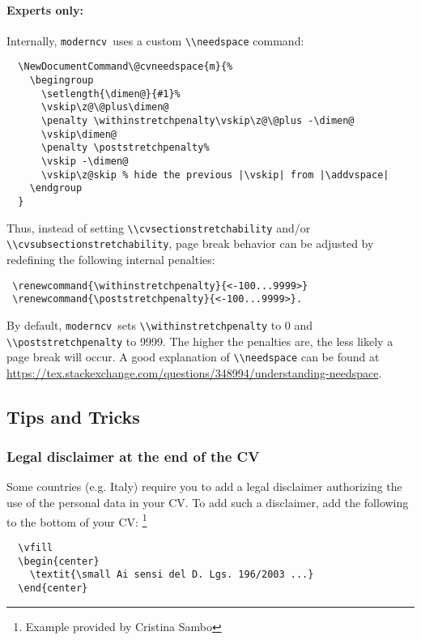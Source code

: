 \documentclass[a4paper, 11pt]{article}
\newcommand{\code}[1]{\lstinline!#1!}
\newcommand{\moderncv}{\code{moderncv}}
\newcommand{\Moderncv}{\moderncv~}
\begin{document}
\paragraph{Experts only:}
Internally, \Moderncv uses a custom \code{\\needspace} command:
\begin{lstlisting}
  \NewDocumentCommand\@cvneedspace{m}{%
    \begingroup
      \setlength{\dimen@}{#1}%
      \vskip\z@\@plus\dimen@
      \penalty \withinstretchpenalty\vskip\z@\@plus -\dimen@
      \vskip\dimen@
      \penalty \poststretchpenalty%
      \vskip -\dimen@
      \vskip\z@skip % hide the previous |\vskip| from |\addvspace|
    \endgroup
  }
\end{lstlisting}
Thus, instead of setting \code{\\cvsectionstretchability} and/or \code{\\cvsubsectionstretchability}, page break behavior can be adjusted by redefining the following internal penalties:
\begin{lstlisting}
 \renewcommand{\withinstretchpenalty}{<-100...9999>}
 \renewcommand{\poststretchpenalty}{<-100...9999>}.
\end{lstlisting}
By default, \Moderncv sets \code{\\withinstretchpenalty} to 0 and \code{\\poststretchpenalty} to 9999.
The higher the penalties are, the less likely a page break will occur.
A good explanation of \code{\\needspace} can be found at \url{https://tex.stackexchange.com/questions/348994/understanding-needspace}.


\subsection{Tips and Tricks}
\subsubsection{Legal disclaimer at the end of the CV}
Some countries (e.g. Italy) require you to add a legal disclaimer authorizing the use of the personal data in your CV.
To add such a disclaimer, add the following to the bottom of your CV:%
\footnote{Example provided by Cristina Sambo}%
\begin{lstlisting}
  \vfill
  \begin{center}
    \textit{\small Ai sensi del D. Lgs. 196/2003 ...}
  \end{center}
\end{lstlisting}
\end{document}
